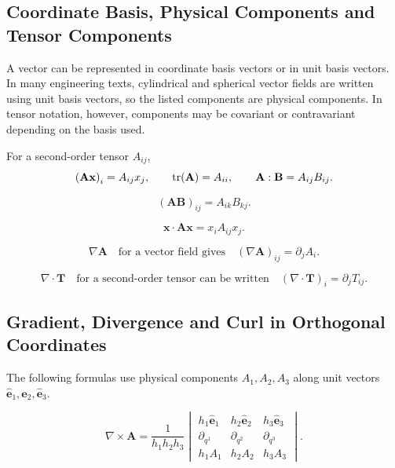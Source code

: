 \documentclass{otscience}
\begin{document}
\subsection{Coordinate Basis, Physical Components and Tensor Components}

A vector can be represented in coordinate basis vectors or in unit basis vectors. In many engineering texts, cylindrical and spherical vector fields are written using unit basis vectors, so the listed components are physical components. In tensor notation, however, components may be covariant or contravariant depending on the basis used.

\begin{formulabox}
    For a second-order tensor \(A_{ij}\),
    \[
        {(\mathbf{A}\mathbf{x})}_i=A_{ij}x_j,
        \qquad
        \operatorname{tr}(\mathbf{A})=A_{ii},
        \qquad
        \mathbf{A}:\mathbf{B}=A_{ij}B_{ij}.
    \]

    \[
        {(\mathbf{A}\mathbf{B})}_{ij}=A_{ik}B_{kj}.
    \]

    \[
        \mathbf{x}\cdot\mathbf{A}\mathbf{x}=x_{i}A_{ij}x_j.
    \]

    \[
        \nabla\mathbf{A}\quad\text{for a vector field gives}\quad {(\nabla\mathbf{A})}_{ij}=\partial_j A_i.
    \]

    \[
        \nabla\cdot\mathbf{T}\quad\text{for a second-order tensor can be written}\quad {(\nabla\cdot\mathbf{T})}_i=\partial_{j}T_{ij}.
    \]
\end{formulabox}

\subsection{Gradient, Divergence and Curl in Orthogonal Coordinates}

The following formulas use physical components \(A_1,A_2,A_3\) along unit vectors \(\hat{\mathbf{e}}_1,\hat{\mathbf{e}}_2,\hat{\mathbf{e}}_3\).

\begingroup
\small
\setlength{\arraycolsep}{3pt}
\[
    \nabla\times\mathbf{A}
    =
    \frac{1}{h_1h_2h_3}
    \begin{vmatrix}
        h_1\hat{\mathbf{e}}_1 & h_2\hat{\mathbf{e}}_2 & h_3\hat{\mathbf{e}}_3 \\
        \partial_{q^1}        & \partial_{q^2}        & \partial_{q^3}        \\
        h_1A_1                & h_2A_2                & h_3A_3
    \end{vmatrix}.
\]
\endgroup
\end{document}

